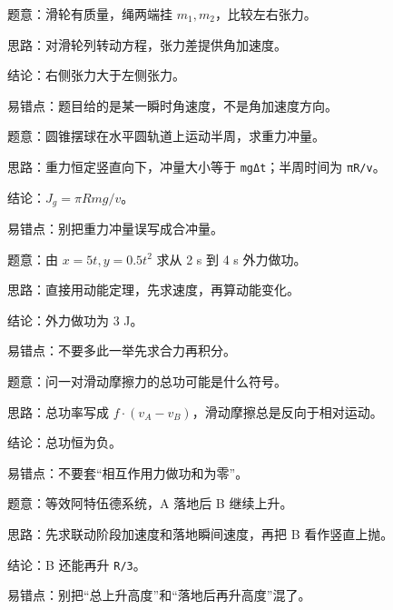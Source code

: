 \documentclass[12pt,a4paper]{ctexart}
\begin{document}
\begin{tcolorbox}[colback=white,colframe=black!55,title={6. 有转动惯量的定滑轮两侧张力大小比较}]
题意：滑轮有质量，绳两端挂 \(m_1,m_2\)，比较左右张力。\par
思路：对滑轮列转动方程，张力差提供角加速度。\par
结论：右侧张力大于左侧张力。\par
易错点：题目给的是某一瞬时角速度，不是角加速度方向。\par
\end{tcolorbox}

\begin{tcolorbox}[colback=white,colframe=black!55,title={7. 圆锥摆运动半周时重力冲量大小}]
题意：圆锥摆球在水平圆轨道上运动半周，求重力冲量。\par
思路：重力恒定竖直向下，冲量大小等于 \texttt{mgΔt}；半周时间为 \texttt{πR/v}。\par
结论：\(J_g=πRmg/v\)。\par
易错点：别把重力冲量误写成合冲量。\par
\end{tcolorbox}

\begin{tcolorbox}[colback=white,colframe=black!55,title={8. 已知质点平面运动方程，求一段时间内外力做功}]
题意：由 \(x=5t, y=0.5t^2\) 求从 2 s 到 4 s 外力做功。\par
思路：直接用动能定理，先求速度，再算动能变化。\par
结论：外力做功为 3 J。\par
易错点：不要多此一举先求合力再积分。\par
\end{tcolorbox}

\begin{tcolorbox}[colback=white,colframe=black!55,title={9. 一对滑动摩擦力分别作用在两物体上时，作功之和如何}]
题意：问一对滑动摩擦力的总功可能是什么符号。\par
思路：总功率写成 \(f·(v_A-v_B)\)，滑动摩擦总是反向于相对运动。\par
结论：总功恒为负。\par
易错点：不要套“相互作用力做功和为零”。\par
\end{tcolorbox}

\begin{tcolorbox}[colback=white,colframe=black!55,title={10. 两球跨过光滑圆柱，A 落地后 B 还能再升多高}]
题意：等效阿特伍德系统，A 落地后 B 继续上升。\par
思路：先求联动阶段加速度和落地瞬间速度，再把 B 看作竖直上抛。\par
结论：B 还能再升 \texttt{R/3}。\par
易错点：别把“总上升高度”和“落地后再升高度”混了。\par
\end{tcolorbox}
\end{document}
